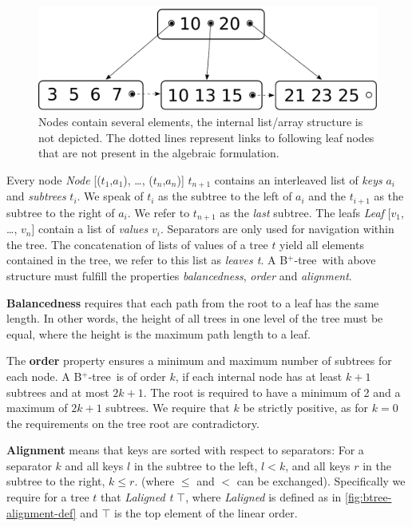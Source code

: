 \documentclass[a4paper,UKenglish,cleveref, autoref, thm-restate]{lipics-v2021}
\newcommand{\btree}{B$^+$-tree}
\begin{document}
\begin{figure}
    \centering
    \includegraphics[width=0.5\linewidth]{btree-basic-nopair.pdf}
    \caption[Visualization of a \btree]
    {Nodes contain several elements, the internal list/array structure is not depicted.
    The dotted lines represent links to following leaf nodes that are not present in the algebraic formulation.}
    \label{fig:btree-basic}
\end{figure}


Every node \emph{Node} [($t_1$,$a_1$), …, ($t_n$,$a_n$)] $t_{n+1}$ contains an interleaved list of \textit{keys} $a_i$ and \textit{subtrees} $t_i$.
We speak of $t_i$ as the subtree to the left of $a_i$ and
the $t_{i+1}$ as the subtree to the right of $a_i$.
We refer to $t_{n+1}$ as the \textit{last} subtree.
The leafs \emph{Leaf} [$v_1$, …, $v_n$] contain a list of \textit{values} $v_i$.
Separators are only used for navigation within the tree.
The concatenation of lists of values of a tree $t$ yield
all elements contained in the tree, we refer to this list as \emph{leaves t}.
A \btree\ with above structure must fulfill the properties
\textit{balancedness}, \textit{order} and \textit{alignment}.

\textbf{Balancedness} requires
that each path from the root to a leaf has the same length.
In other words, the height of all trees in one level of the tree must be equal,
where the height is the maximum path length to a leaf.

The \textbf{order} property ensures a minimum and maximum
number of subtrees for each node.
A \btree\ is of order $k$, if each internal node has at least $k+1$
subtrees and at most $2k+1$.
The root is required to have a minimum of 2 and a maximum of $2k+1$ subtrees.
We require that $k$ be strictly positive, as for $k = 0$ the requirements on the tree
root are contradictory.

\textbf{Alignment} means that keys are sorted with respect to separators:
For a separator $k$ and all keys $l$ in the subtree to the left, $l < k$,
and all keys $r$ in the subtree to the right, $k \leq r$.
(where $\leq$ and $<$ can be exchanged).
Specifically we require for a tree $t$ that \emph{Laligned t $\top$},
where \emph{Laligned} is defined as in \autoref{fig:btree-alignment-def}
and $\top$ is the top element of the linear order. 
\end{document}
